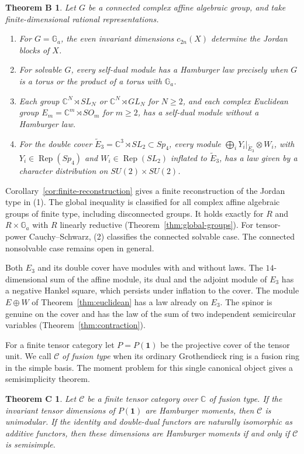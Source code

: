 \documentclass[11pt,reqno]{amsart}
\newtheorem*{theoremB}{Theorem B}
\newtheorem*{theoremC}{Theorem C}
\theoremstyle{definition}
\newcommand{\one}{\mathbf 1}
\newcommand{\C}{\mathcal C}
\newcommand{\CC}{\mathbb C}
\newcommand{\Ga}{\mathbb G_a}
\newcommand{\Rep}{\operatorname{Rep}}
\begin{document}
\begin{theoremB}
Let $G$ be a connected complex affine algebraic group, and take finite-dimensional rational representations.
\begin{enumerate}
\item For $G=\Ga$, the even invariant dimensions $c_{2n}(X)$ determine the Jordan blocks of $X$.
\item For solvable $G$, every self-dual module has a Hamburger law precisely when $G$ is a torus or the product of a torus with $\Ga$.
\item Each group $\CC^N\rtimes SL_N$ or $\CC^N\rtimes GL_N$ for $N\ge2$, and each complex Euclidean group $E_m=\CC^m\rtimes SO_m$ for $m\ge2$, has a self-dual module without a Hamburger law.
\item For the double cover $\widetilde E_3=\CC^3\rtimes SL_2\subset Sp_4$, every module $\bigoplus_i Y_i|_{\widetilde E_3}\otimes W_i$, with $Y_i\in\Rep(Sp_4)$ and $W_i\in\Rep(SL_2)$ inflated to $\widetilde E_3$, has a law given by a character distribution on $SU(2)\times SU(2)$.
\end{enumerate}
\end{theoremB}

Corollary~\ref{cor:finite-reconstruction} gives a finite reconstruction of the Jordan type in (1). The global inequality is classified for all complex affine algebraic groups of finite type, including disconnected groups. It holds exactly for $R$ and $R\times\Ga$ with $R$ linearly reductive (Theorem~\ref{thm:global-groups}). For tensor-power Cauchy--Schwarz, (2) classifies the connected solvable case. The connected nonsolvable case remains open in general.

Both $E_3$ and its double cover have modules with and without laws. The $14$-dimensional sum of the affine module, its dual and the adjoint module of $E_3$ has a negative Hankel square, which persists under inflation to the cover. The module $E\oplus W$ of Theorem~\ref{thm:euclidean} has a law already on $E_3$. The spinor is genuine on the cover and has the law of the sum of two independent semicircular variables (Theorem~\ref{thm:contraction}).

For a finite tensor category let $P=P(\one)$ be the projective cover of the tensor unit. We call $\C$ \emph{of fusion type} when its ordinary Grothendieck ring is a fusion ring in the simple basis. The moment problem for this single canonical object gives a semisimplicity theorem.

\begin{theoremC}
Let $\C$ be a finite tensor category over $\CC$ of fusion type. If the invariant tensor dimensions of $P(\one)$ are Hamburger moments, then $\C$ is unimodular. If the identity and double-dual functors are naturally isomorphic as additive functors, then these dimensions are Hamburger moments if and only if $\C$ is semisimple.
\end{theoremC}
\end{document}
